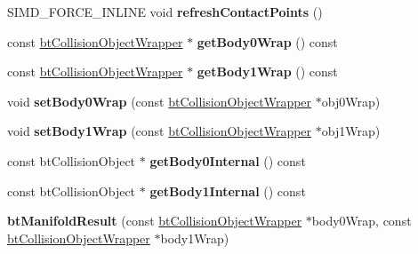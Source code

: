 \begin{DoxyCompactItemize}
\item 
\mbox{\label{classbtManifoldResult_adbcfd865252ac9dc8a3543f404e2dcf1}} 
S\+I\+M\+D\+\_\+\+F\+O\+R\+C\+E\+\_\+\+I\+N\+L\+I\+NE void {\bfseries refresh\+Contact\+Points} ()
\item 
\mbox{\label{classbtManifoldResult_a3ffec9c15260f1a8c22ace0cd2b52d75}} 
const \hyperlink{structbtCollisionObjectWrapper}{bt\+Collision\+Object\+Wrapper} $\ast$ {\bfseries get\+Body0\+Wrap} () const
\item 
\mbox{\label{classbtManifoldResult_a140127f80ee0efb8a8301a6a0c7c304c}} 
const \hyperlink{structbtCollisionObjectWrapper}{bt\+Collision\+Object\+Wrapper} $\ast$ {\bfseries get\+Body1\+Wrap} () const
\item 
\mbox{\label{classbtManifoldResult_a0599942ca5ec1ddf5ea914ce734ba272}} 
void {\bfseries set\+Body0\+Wrap} (const \hyperlink{structbtCollisionObjectWrapper}{bt\+Collision\+Object\+Wrapper} $\ast$obj0\+Wrap)
\item 
\mbox{\label{classbtManifoldResult_a6fd0c696483fd32ab5def0785a9dbc12}} 
void {\bfseries set\+Body1\+Wrap} (const \hyperlink{structbtCollisionObjectWrapper}{bt\+Collision\+Object\+Wrapper} $\ast$obj1\+Wrap)
\item 
\mbox{\label{classbtManifoldResult_a10455cf6b5f6999359852732bf91b4ab}} 
const bt\+Collision\+Object $\ast$ {\bfseries get\+Body0\+Internal} () const
\item 
\mbox{\label{classbtManifoldResult_af872b6f2fc0c82d64d4f35b710bae861}} 
const bt\+Collision\+Object $\ast$ {\bfseries get\+Body1\+Internal} () const
\item 
\mbox{\label{classbtManifoldResult_a012034766365adbebc5a4430f6dfa955}} 
{\bfseries bt\+Manifold\+Result} (const \hyperlink{structbtCollisionObjectWrapper}{bt\+Collision\+Object\+Wrapper} $\ast$body0\+Wrap, const \hyperlink{structbtCollisionObjectWrapper}{bt\+Collision\+Object\+Wrapper} $\ast$body1\+Wrap)
\item 
\mbox{\label{classbtManifoldResult_a7a46d46b9a13c2896695e458c1d6df1f}} 

\end{DoxyCompactItemize}
